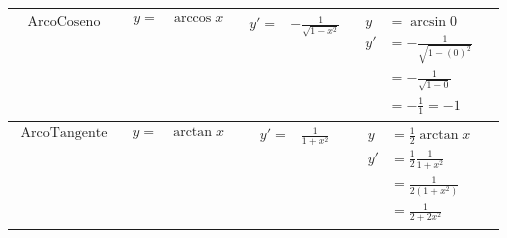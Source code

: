 \documentclass[../../main]{subfiles}
\begin{document}
\begin{center}
\begin{longtable}{ |p{7em}|p{5em}|p{5em}|p{7em}|p{5cm}| }
        \begin{align*}
            \text{ArcoCoseno}
        \end{align*} &
        {
            \begin{align*}
                y=&\arccos{x} 
            \end{align*} 
        } &
        {
            \begin{align*}
                y'=&-\frac{1}{\sqrt{1-x^2}} 
            \end{align*} 
        } &
        {
            \begin{align*}
                y & =\arcsin{0}  \\
                y' & = -\frac{1}{\sqrt{1-(0)^2}}  \\ 
                    & = -\frac{1}{\sqrt{1-0}}  \\
                    & = -\frac{1}{1} = -1 
            \end{align*}
        } &
        {
        \begin{center}
        \end{center}
        } \\

        \hline
        
        \begin{align*}
            \text{ArcoTangente} 
        \end{align*} &
        {
            \begin{align*}
                y=&\arctan{x} 
            \end{align*}  
        }&
        {
            \begin{align*}
                y'=&\frac{1}{1+x^2} 
            \end{align*} 
        }&
        {
            \begin{align*}
                y &= \frac{1}{2}\arctan{x}  \\
                y' &= \frac{1}{2} \frac{1}{1+x^2}  \\
                    &= \frac{1}{2(1+x^2)}  \\
                    &= \frac{1}{2+2x^2} 
            \end{align*}
        } &
        {
        \begin{center}
        \end{center}
        } \\

        \hline


\end{longtable}
\end{center}
\end{document}
